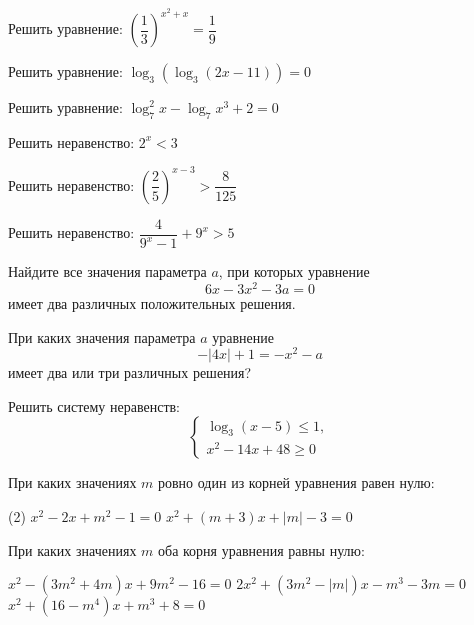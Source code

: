 \begin{exam}
	\begin{listofex}
		\item Решить уравнение: \( \left( \dfrac{1}{3} \right)^{x^2+x}=\dfrac{1}{9} \)
		\item Решить уравнение: \( \log_3(\log_3(2x-11))=0 \)
		\item Решить уравнение: \( \log^2_7x-\log_7x^3+2=0 \)
		\item Решить неравенство: \( 2^x<3 \)
		\item Решить неравенство: \( \left( \dfrac{2}{5} \right)^{x-3}>\dfrac{8}{125} \)
		\item Решить неравенство: \( \dfrac{4}{9^x-1}+9^x>5 \)
		\item Найдите все значения параметра \( a \), при которых уравнение
		\[ 6x-3x^2-3a=0 \]
		имеет два различных положительных решения.
		\item При каких значения параметра \( a \) уравнение
		\[ -|4x|+1=-x^2-a \]
		имеет два или три различных решения?
		\item Решить систему неравенств:
		\[ \left\{
		\begin{array}{l}
			\log_3(x-5)\le1,\\
			x^2-14x+48\ge0
		\end{array}
		\right. \]
	\end{listofex}
\end{exam}

\begin{consultation}
	\begin{listofex}
		\item При каких значениях \(m\) ровно один из корней уравнения равен нулю:
		\begin{tasks}(2)
			\task \( x^2-2x+m^2-1=0 \)
			\task \( x^2+(m+3)x+|m|-3=0 \)
		\end{tasks}
		\item При каких значениях \(m\) оба корня уравнения равны нулю:
		\begin{tasks}
			\task \( x^2-(3m^2+4m)x+9m^2-16=0 \)
			\task \( 2x^2+(3m^2-|m|)x-m^3-3m=0 \)
			\task \( x^2+(16-m^4)x+m^3+8=0 \)
		\end{tasks}
		
	\end{listofex}
\end{consultation}

